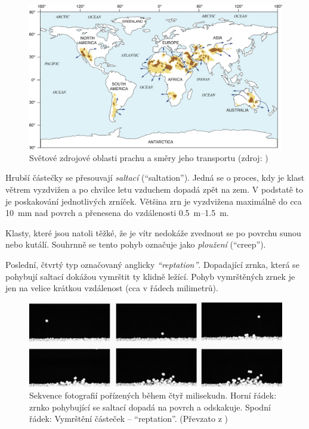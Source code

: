 \begin{figure}
	\centering
	\includegraphics[width=1\linewidth]{obrazky/eolicka/zdroje_prachu}
	\caption{Světové zdrojové oblasti prachu a směry jeho transportu (zdroj: \textcite{muhsIdentifyingSourcesAeolian2014})}
	\label{fig:zdrojprachu}
\end{figure}

Hrubší částečky se přesouvají \emph{saltací} (\enquote{saltation}). Jedná se o proces, kdy je klast větrem vyzdvižen a po chvilce letu vzduchem dopadá zpět na zem. V podstatě to je poskakování jednotlivých zrníček. Většina zrn je vyzdvižena maximálně do cca \SI{10}{\milli\metre} nad povrch a přenesena do vzdálenosti \SIrange{0,5}{1,5}{\metre}.

Klasty, které jsou natoli těžké, že je vítr nedokáže zvednout se po povrchu sunou nebo kutálí. Souhrnně se tento pohyb označuje jako \emph{ploužení} (\enquote{creep}).

Poslední, čtvrtý typ označovaný anglicky \emph{\enquote{reptation}}. Dopadající zrnka, která se pohybují saltací dokážou vymrštit ty klidně ležící. Pohyb vymrštěných zrnek je jen na velice krátkou vzdálenost (cca v řádech milimetrů).

\begin{figure}
	\centering
	\includegraphics[width=1\linewidth]{obrazky/eolicka/saltace_foto}
	\caption{Sekvence fotografií pořízených během čtyř milisekudn. Horní řádek: zrnko pohybující se saltací dopadá na povrch a odskakuje. Spodní řádek: Vymrštění částeček -- \enquote{reptation}. (Převzato z \textcite{beladjineCollisionProcessIncident2007})}
	\label{fig:saltacefoto}
\end{figure}


